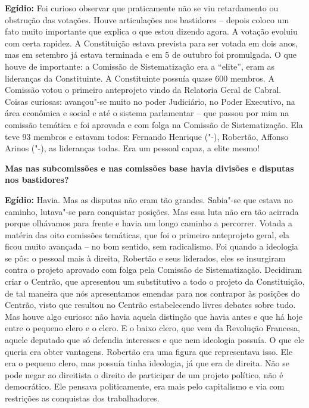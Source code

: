 \textbf{Egídio:} Foi curioso observar que praticamente não se viu
retardamento ou obstrução das votações. Houve articulações nos
bastidores -- depois coloco um fato muito importante que explica o que
estou dizendo agora. A votação evoluiu com certa rapidez. A Constituição
estava prevista para ser votada em dois anos, mas em setembro já estava
terminada e em 5 de outubro foi promulgada. O que houve de importante: a
Comissão de Sistematização era a ``elite'', eram as lideranças da
Constituinte. A Constituinte possuía quase 600 membros. A Comissão votou
o primeiro anteprojeto vindo da Relatoria Geral de Cabral. Coisas
curiosas: avançou"-se muito no poder Judiciário, no Poder Executivo, na
área econômica e social e até o sistema parlamentar -- que passou por
mim na comissão temática e foi aprovada e com folga na Comissão de
Sistematização. Ela teve 93 membros e estavam todos: Fernando Henrique
("-), Robertão, Affonso Arinos ("-), as lideranças todas. Era
um pessoal capaz, a elite mesmo!

\textbf{Mas nas subcomissões e nas comissões base havia divisões e
disputas nos bastidores?}

\textbf{Egídio:} Havia. Mas as disputas não eram tão grandes. Sabia"-se
que estava no caminho, lutava"-se para conquistar posições. Mas essa luta
não era tão acirrada porque olhávamos para frente e havia um longo
caminho a percorrer. Votada a matéria das oito comissões temáticas, que
foi o primeiro anteprojeto geral, ela ficou muito avançada -- no bom
sentido, sem radicalismo. Foi quando a ideologia se pôs: o pessoal mais
à direita, Robertão e seus liderados, eles se insurgiram contra o
projeto aprovado com folga pela Comissão de Sistematização. Decidiram
criar o Centrão, que apresentou um substitutivo a todo o projeto da
Constituição, de tal maneira que nós apresentamos emendas para nos
contrapor às posições do Centrão, visto que resultou no Centrão
estabelecendo livres debates sobre tudo. Mas houve algo curioso: não
havia aquela distinção que havia antes e que há hoje entre o pequeno
clero e o clero. E o baixo clero, que vem da Revolução Francesa, aquele
deputado que só defendia interesses e que nem ideologia possuía. O que
ele queria era obter vantagens. Robertão era uma figura que representava
isso. Ele era o pequeno clero, mas possuía tinha ideologia, já que era
de direita. Não se pode negar ao direitista o direito de participar de
um projeto político, não é democrático. Ele pensava politicamente, era
mais pelo capitalismo e via com restrições as conquistas dos
trabalhadores.


